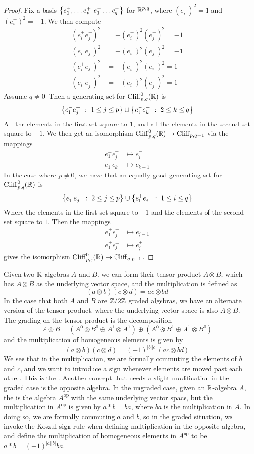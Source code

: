 \begin{proof}
Fix a basis $\left\lbrace e_1^+, \ldots e_p^+, e_1^- \ldots e_q^- \right\rbrace$ for $\mathbb{R}^{p,q}$, where
$(e_i^+)^2 = 1$ and $(e_i^-)^2 = -1$. We then compute
%
\begin{align*}
(e_i^+e_j^+)^2 & = -(e_i^+)^2(e_j^+)^2 = -1 \\
(e_i^-e_j^-)^2 & = -(e_i^-)^2(e_j^-)^2 = -1 \\
(e_i^+e_j^-)^2 & = -(e_i^+)^2(e_i^-)^2 = 1  \\
(e_i^-e_j^+)^2 & = -(e_i^-)^2(e_j^+)^2 = 1
\end{align*}
%
Assume $q \neq 0$. Then a generating set for $\operatorname{Cliff}_{p,q}^0(\mathbb{R})$ is
\[
\left\lbrace e_1^-e_j^+ ~:~ 1 \leq j \leq p \right\rbrace \cup \left\lbrace e_1^-e_k^- ~:~ 2 \leq k \leq q \right\rbrace
\]
All the elements in the first set square to $1$, and all the elements in the
second set square to $-1$. We then get an isomorphism
$\operatorname{Cliff}^0_{p,q}(\mathbb{R}) \to \operatorname{Cliff}_{p,q-1}$ via the mappings
\begin{align*}
e_1^-e_j^+ & \mapsto e_j^+     \\
e_1^-e_k^- & \mapsto e_{k-1}^-
\end{align*}
In the case where $p \neq 0$, we have that an equally good generating set for
$\operatorname{Cliff}_{p,q}^0(\mathbb{R})$ is
\[
\left\lbrace e^+_1e_j^+ ~:~ 2 \leq j \leq p \right\rbrace \cup \left\lbrace e_1^+e_i^- ~:~ 1 \leq i \leq q \right\rbrace
\]
Where the elements in the first set square to $-1$ and the elements of the second
set square to $1$. Then the mappings
\begin{align*}
e_1^+e_j^+ & \mapsto e_{j-1}^- \\
e_1^+e_j^- & \mapsto e_j^+
\end{align*}
gives the isomorphism $\operatorname{Cliff}_{p,q}^0(\mathbb{R}) \to \operatorname{Cliff}_{q, p-1}$.
\end{proof}
%
Given two $\mathbb{R}$-algebras $A$ and $B$, we can form their tensor product
$A \otimes B$, which has $A \otimes B$ as the underlying vector space, and the
multiplication is defined as
\[
(a \otimes b)(c \otimes d) = ac \otimes bd
\]
In the case that both $A$ and $B$ are $\mathbb{Z}/2\mathbb{Z}$ graded algebras, we have an alternate
version of the tensor product, where the underlying vector space is also
$A \otimes B$. The grading on the tensor product is the decomposition
\[
A \otimes B = (A^0 \otimes B^0 \oplus A^1 \otimes A^1) \oplus (A^0 \otimes B^1
\oplus A^1 \otimes B^0)
\]
and the multiplication of homogeneous elements is given by
\[
(a \otimes b)(c \otimes d) = (-1)^{|b||c|}(ac \otimes bd)
\]
We see that in the multiplication, we are formally commuting the elements of
$b$ and $c$, and we want to introduce a sign whenever elements are moved past
each other. This is the . Another concept that needs
a slight modification in the graded case is the opposite algebra. In the
ungraded case, given an $\mathbb{R}$-algebra $A$, the  is
the algebra $A^{\text{op}}$ with the same underlying vector space, but
the multiplication in $A^\text{op}$ is given by $a * b = ba$, where $ba$
is the multiplication in $A$. In doing so, we are formally commuting $a$
and $b$, so in the graded situation, we invoke the Koszul sign rule when
defining multiplication in the opposite algebra, and define the multiplication
of homogeneous elements in $A^{\text{op}}$ to be $a * b = (-1)^{|a||b|} ba$.\\

